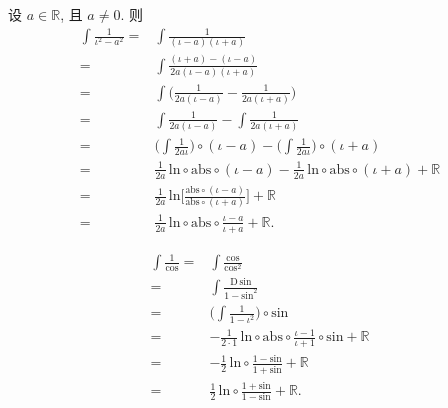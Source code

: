 \begin{example}
    设 $a \in \mathbb{R}$, 且 $a \neq 0$.
    则
    \begin{align*}
        \int {\frac{1}{\iota^2 - a^2}}
        = {} & \int {\frac{1}{(\iota - a)(\iota + a)}}                                \\
        = {} & \int {\frac{(\iota + a) - (\iota - a)}{2a(\iota - a)(\iota + a)}}      \\
        = {} & \int {\Bigg( \frac{1}{2a(\iota - a)} - \frac{1}{2a(\iota + a)} \Bigg)} \\
        = {} & \int {\frac{1}{2a(\iota - a)}} - \int {\frac{1}{2a(\iota + a)}}        \\
        = {} & \Bigg(\int {\frac{1}{2a\iota}}\Bigg) \circ (\iota - a)
        - \Bigg(\int {\frac{1}{2a\iota}}\Bigg) \circ (\iota + a)                      \\
        = {} & \frac{1}{2a}\,\mathrm{ln} \circ \mathrm{abs} \circ (\iota - a)
        - \frac{1}{2a}\,\mathrm{ln} \circ \mathrm{abs} \circ (\iota + a)
        + \mathbb{R}                                                                  \\
        = {} & \frac{1}{2a}\,\mathrm{ln} \Bigg[ \frac{\mathrm{abs} \circ (\iota - a)}
        {\mathrm{abs} \circ (\iota + a)} \Bigg] + \mathbb{R}                          \\
        = {} & \frac{1}{2a}\,\mathrm{ln} \circ \mathrm{abs} \circ
        \frac{\iota - a}{\iota + a} + \mathbb{R}.
    \end{align*}
\end{example}

\begin{example}
    \begin{align*}
        \int {\frac{1}{\mathrm{cos}}}
        = {} & \int {\frac{\mathrm{cos}}{\mathrm{cos}^2}}                               \\
        = {} & \int {\frac{\mathrm{D}\,\mathrm{sin}}{1 - \mathrm{sin}^2}}               \\
        = {} & \Bigg( \int {\frac{1}{1 - \iota^2}} \Bigg) \circ \mathrm{sin}            \\
        = {} & -\frac{1}{2 \cdot 1}\,\mathrm{ln} \circ \mathrm{abs}
        \circ \frac{\iota - 1}{\iota + 1} \circ \mathrm{sin} + \mathbb{R}               \\
        = {} & -\frac{1}{2}\,\mathrm{ln} \circ
        \frac{1 - \mathrm{sin}}{1 + \mathrm{sin}} + \mathbb{R}                          \\
        = {} & \frac{1}{2}\,\mathrm{ln} \circ \frac{1 + \mathrm{sin}}{1 - \mathrm{sin}}
        + \mathbb{R}.
    \end{align*}
\end{example}

